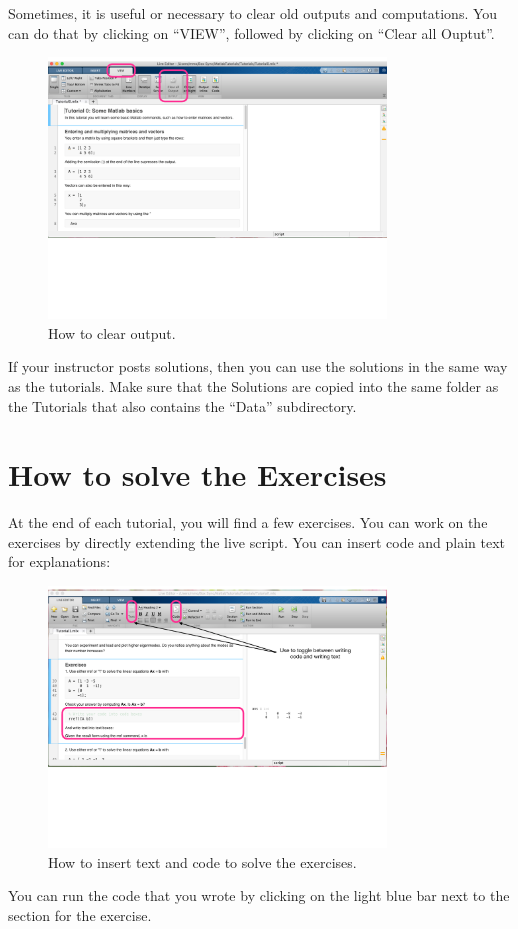 \documentclass[11pt]{article}
\begin{document}
\vspace{2mm}
\noindent
Sometimes, it is useful or necessary to clear old outputs and computations.
You can do that by clicking on ``VIEW'', followed by clicking on
``Clear all Ouptut''. 
\begin{figure}[h!]
\centering
\includegraphics[width=0.8\textwidth]{Clear.pdf}
\caption{
How to clear output.
}
\end{figure}

\vspace{2mm}
\noindent
If your instructor posts solutions, 
then you can use the solutions in the same way as the tutorials.
Make sure that the Solutions are copied into the same folder
as the Tutorials that also contains the ``Data'' subdirectory.


\section{How to solve the Exercises}
At the end of each tutorial, 
you will find a few exercises.
You can work on the exercises by directly extending the live script.
You can insert code and plain text for explanations:
\begin{figure}[h!]
\centering
\includegraphics[width=0.8\textwidth]{Exercise.pdf}
\caption{
How to insert text and code to solve the exercises.
}
\end{figure}
You can run the code that you wrote by clicking on the light blue bar next to the section
for the exercise.
\end{document}
